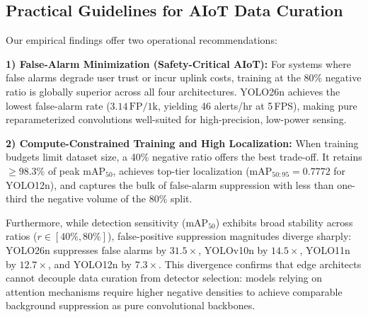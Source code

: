 \documentclass[conference]{IEEEtran}
\begin{document}
\subsection{Practical Guidelines for AIoT Data Curation}
Our empirical findings offer two operational recommendations:

\noindent\textbf{1) False-Alarm Minimization (Safety-Critical AIoT):} For systems where false alarms degrade user trust or incur uplink costs, training at the 80\% negative ratio is globally superior across all four architectures. YOLO26n achieves the lowest false-alarm rate ($3.14\,\mathrm{FP/1k}$, yielding 46 alerts/hr at 5\,FPS), making pure reparameterized convolutions well-suited for high-precision, low-power sensing.

\noindent\textbf{2) Compute-Constrained Training and High Localization:} When training budgets limit dataset size, a 40\% negative ratio offers the best trade-off. It retains $\ge 98.3\%$ of peak $\mathrm{mAP}_{50}$, achieves top-tier localization ($\mathrm{mAP}_{50:95} = 0.7772$ for YOLO12n), and captures the bulk of false-alarm suppression with less than one-third the negative volume of the 80\% split.

Furthermore, while detection sensitivity ($\mathrm{mAP}_{50}$) exhibits broad stability across ratios ($r \in [40\%, 80\%]$), false-positive suppression magnitudes diverge sharply: YOLO26n suppresses false alarms by $31.5\times$, YOLOv10n by $14.5\times$, YOLO11n by $12.7\times$, and YOLO12n by $7.3\times$. This divergence confirms that edge architects cannot decouple data curation from detector selection: models relying on attention mechanisms require higher negative densities to achieve comparable background suppression as pure convolutional backbones.
\end{document}
